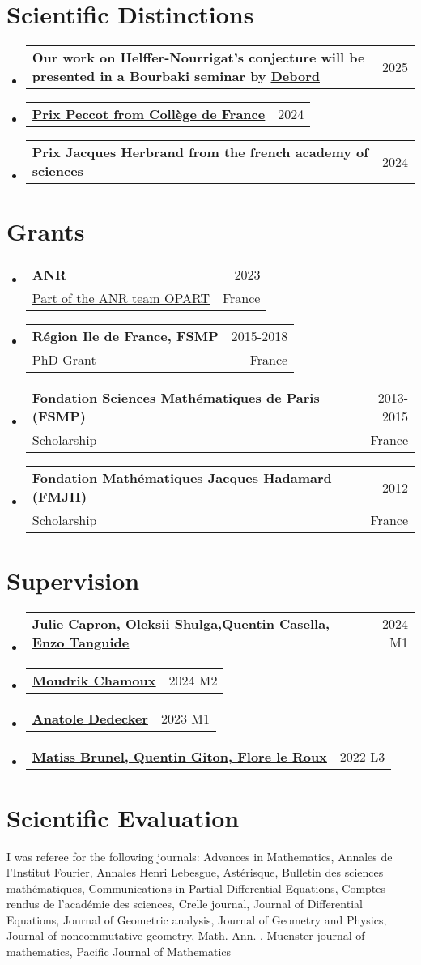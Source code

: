 \documentclass[A4,11pt]{article}
\makeatletter
\newcommand{\CVSubheading}[4]{
  \vspace{-2pt}\item
    \begin{tabular*}{0.97\textwidth}[t]{l@{\extracolsep{\fill}}r}
      \textbf{#1} & #2 \\
      \small#3 & \small #4 \\
    \end{tabular*}\vspace{-7pt}
}
\newcommand{\CVSubheadingshort}[2]{
  \vspace{-2pt}\item
    \begin{tabular*}{0.97\textwidth}[t]{l@{\extracolsep{\fill}}r}
      \textbf{#1} & #2 \\
    \end{tabular*}\vspace{-7pt}
}
\newcommand{\CVSubHeadingListStart}{\begin{itemize}[leftmargin=0.5cm, label={}]}
\newcommand{\CVSubHeadingListEnd}{\end{itemize}}
\makeatother
\begin{document}
  \section{Scientific Distinctions}
\CVSubHeadingListStart
\CVSubheadingshort{Our work on Helffer-Nourrigat's conjecture will be presented in a Bourbaki seminar by \href{https://webusers.imj-prg.fr/~claire.debord/}{\underline{Debord}}}{2025}{}{}
\CVSubheadingshort{\href{https://www.college-de-france.fr/fr/personne/omar-mohsen}{\underline{Prix Peccot from Collège de France}}}{2024}{}{}
   \CVSubheadingshort{Prix Jacques Herbrand from the french academy of sciences}{2024}{}{}
\CVSubHeadingListEnd
 
\section{Grants}
  \CVSubHeadingListStart
\CVSubheading
{ANR}{2023}
{\href{https://anr.fr/Project-ANR-23-CE40-0016}{\underline{Part of the ANR team OPART}}}{France}
    \CVSubheading
      {Région Ile de France, FSMP}{2015-2018}
      {PhD Grant}{France}
      \CVSubheading
      {Fondation Sciences Mathématiques de Paris (FSMP)}{2013-2015}
      {Scholarship}{France}
       \CVSubheading
      {Fondation Mathématiques Jacques Hadamard (FMJH)}{2012}
      {Scholarship}{France}
  \CVSubHeadingListEnd
  \section{Supervision}
  \CVSubHeadingListStart
  
\CVSubheadingshort
{\href{https://omarmohsengit.github.io/MohsenWebPage/Students-Master-Memoires/2324-CAPRON-M1.pdf}{\underline{Julie Capron}}, \href{https://omarmohsengit.github.io/MohsenWebPage/Students-Master-Memoires/2324-Shulga-M1.pdf}{\underline{Oleksii Shulga}},\href{https://omarmohsengit.github.io/MohsenWebPage/Students-Master-Memoires/2324-TanguideCasella-M1.pdf}{\underline{Quentin Casella, Enzo Tanguide}}}{2024 M1}
\CVSubheadingshort
{\href{}{\underline{Moudrik Chamoux}}}{2024 M2}
    \CVSubheadingshort
      {\href{https://github.com/ADedecker/amenable}{\underline{Anatole Dedecker}}}{2023 M1}
      \CVSubheadingshort
      {\href{https://omarmohsengit.github.io/MohsenWebPage/Students-Master-Memoires/2122-Brunel-Giton-LeRoux-L3.pdf}{\underline{Matiss Brunel, Quentin Giton, Flore le Roux}}}{2022 L3}

  \CVSubHeadingListEnd
  \section{Scientific Evaluation}
  I was referee for the following journals: Advances in Mathematics, Annales de l'Institut Fourier, Annales Henri Lebesgue, Astérisque, Bulletin des sciences mathématiques, Communications in Partial Differential Equations, Comptes rendus de l'académie des sciences, Crelle journal, Journal of Differential Equations, Journal of Geometric analysis, Journal of Geometry and Physics, Journal of noncommutative geometry, Math. Ann.  , Muenster journal of mathematics, Pacific Journal of Mathematics
\end{document}
